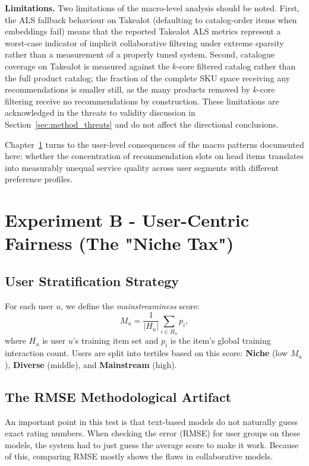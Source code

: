 \documentclass[11pt,a4paper]{report}
\begin{document}
\textbf{Limitations.} Two limitations of the macro-level analysis should be noted. First, the ALS fallback behaviour on Takealot (defaulting to catalog-order items when embeddings fail) means that the reported Takealot ALS metrics represent a worst-case indicator of implicit collaborative filtering under extreme sparsity rather than a measurement of a properly tuned system. Second, catalogue coverage on Takealot is measured against the $k$-core filtered catalog rather than the full product catalog; the fraction of the complete SKU space receiving any recommendations is smaller still, as the many products removed by $k$-core filtering receive no recommendations by construction. These limitations are acknowledged in the threats to validity discussion in Section~\ref{sec:method_threats} and do not affect the directional conclusions.

Chapter~\ref{ch:exp_b} turns to the user-level consequences of the macro patterns documented here: whether the concentration of recommendation slots on head items translates into measurably unequal service quality across user segments with different preference profiles.


\chapter{Experiment B - User-Centric Fairness (The "Niche Tax")}
\label{ch:exp_b}

\section{User Stratification Strategy}
For each user $u$, we define the \emph{mainstreaminess} score:
\begin{equation}
  M_u = \frac{1}{|H_u|} \sum_{i \in H_u} p_i ,
\end{equation}
where $H_u$ is user $u$'s training item set and $p_i$ is the item's global training interaction count. Users are split into tertiles based on this score: \textbf{Niche} (low $M_u$), \textbf{Diverse} (middle), and \textbf{Mainstream} (high).

\section{The RMSE Methodological Artifact}
An important point in this test is that text-based models do not naturally guess exact rating numbers. When checking the error (RMSE) for user groups on these models, the system had to just guess the average score to make it work. Because of this, comparing RMSE mostly shows the flaws in collaborative models.
\end{document}
